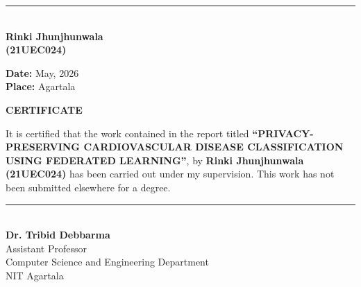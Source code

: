 \documentclass{nitathesis}
\begin{document}
\vspace{2.5in}

\begin{flushright}
    \rule{6cm}{0.4pt}\\
    \textbf{Rinki Jhunjhunwala}\\
    \textbf{(21UEC024)}
\end{flushright}

\vspace{0.6cm}
\noindent \textbf{Date:} May, 2026\\
\noindent \textbf{Place:} Agartala

\cleardoublepage
\thispagestyle{plain}
\begin{center}
    \vspace*{0.3in}
    {\Large \textbf{CERTIFICATE}\par}
    \vspace{0.8in}
\end{center}

\noindent It is certified that the work contained in the report titled \textbf{``PRIVACY-PRESERVING CARDIO\-VASCULAR DISEASE CLASSIFICATION USING FEDERATED LEARNING''}, by \textbf{Rinki Jhunjhunwala (21UEC024)} has been carried out under my supervision. This work has not been submitted elsewhere for a degree.

\vspace{3.5in}

\begin{flushright}
    \rule{6.5cm}{0.4pt}\\
    \textbf{Dr. Tribid Debbarma}\\
    Assistant Professor\\
    Computer Science and Engineering Department\\
    NIT Agartala
\end{flushright}
\end{document}
